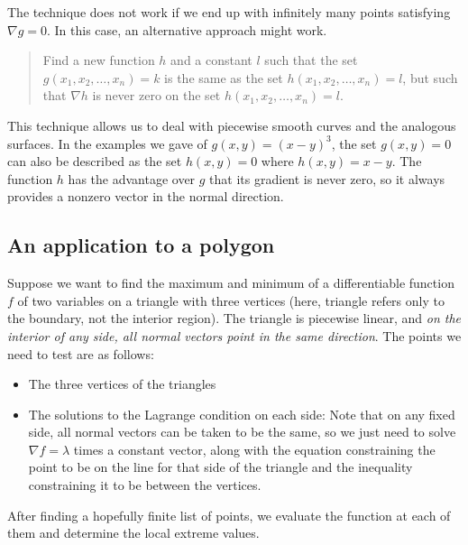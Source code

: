 \documentclass[10pt]{amsart}
\begin{document}
The technique does not work if we end up with infinitely many points
satisfying $\nabla g = 0$. In this case, an alternative approach might work.

\begin{quote}
  Find a new function $h$ and a constant $l$ such that the set
  $g(x_1,x_2,\dots,x_n) = k$ is the same as the set
  $h(x_1,x_2,\dots,x_n) = l$, but such that $\nabla h$ is never zero
  on the set $h(x_1,x_2,\dots,x_n) = l$.
\end{quote}

This technique allows us to deal with piecewise smooth curves and the
analogous surfaces. In the examples we gave of $g(x,y) = (x - y)^3$,
the set $g(x,y) = 0$ can also be described as the set $h(x,y) = 0$
where $h(x,y) = x - y$. The function $h$ has the advantage over $g$
that its gradient is never zero, so it always provides a nonzero
vector in the normal direction.

\subsection{An application to a polygon}

Suppose we want to find the maximum and minimum of a differentiable
function $f$ of two variables on a triangle with three vertices (here,
triangle refers only to the boundary, not the interior region). The
triangle is piecewise linear, and {\em on the interior of any side,
all normal vectors point in the same direction}. The points we need to
test are as follows:

\begin{itemize}
\item The three vertices of the triangles
\item The solutions to the Lagrange condition on each side: Note that
  on any fixed side, all normal vectors can be taken to be the same,
  so we just need to solve $\nabla f = \lambda$ times a constant
  vector, along with the equation constraining the point to be on the
  line for that side of the triangle and the inequality constraining
  it to be between the vertices.
\end{itemize}

After finding a hopefully finite list of points, we evaluate the
function at each of them and determine the local extreme values.
\end{document}
